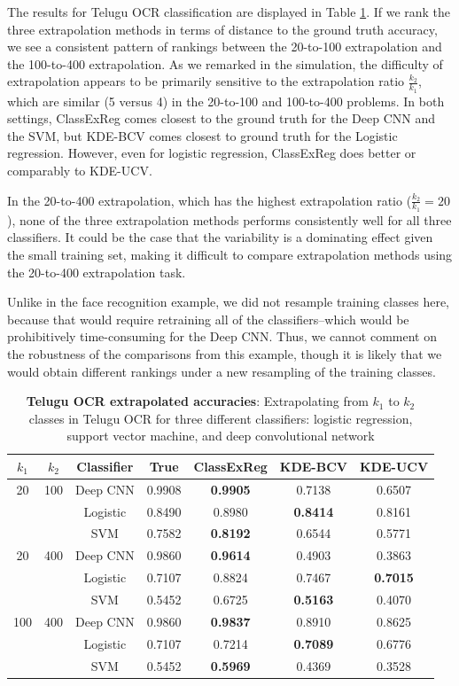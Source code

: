 \documentclass[twoside,11pt]{article}
\begin{document}
The results for Telugu OCR classification are displayed in Table \ref{tab:tel_accuracy}.  If we rank the three extrapolation methods in terms of distance to the ground truth accuracy, we see a consistent pattern of rankings between the 20-to-100 extrapolation and the 100-to-400 extrapolation.  As we remarked in the simulation, the difficulty of extrapolation appears to be primarily sensitive to the extrapolation ratio $\frac{k_2}{k_1}$, which are similar (5 versus 4) in the 20-to-100 and 100-to-400 problems.  In both settings, ClassExReg comes closest to the ground truth for the Deep CNN and the SVM, but KDE-BCV comes closest to ground truth for the Logistic regression.  However, even for logistic regression, ClassExReg does better or comparably to KDE-UCV.


In the 20-to-400 extrapolation, which has the highest extrapolation ratio ($\frac{k_2}{k_1} = 20$), none of the three extrapolation methods performs consistently well for all three classifiers.  It could be the case that the variability is a dominating effect given the small training set, making it difficult to compare extrapolation methods using the 20-to-400 extrapolation task.

Unlike in the face recognition example, we did not resample training classes here, because that would require retraining all of the classifiers--which would be prohibitively time-consuming for the Deep CNN.  Thus, we cannot comment on the robustness of the comparisons from this example, though it is likely that we would obtain different rankings under a new resampling of the training classes.

\begin{table}[t]
\centering
\begin{tabular}{c|c||c|c||c|c|c}
$k_1$ & $k_2$ & Classifier & True & ClassExReg & KDE-BCV & KDE-UCV \\ \hline
 20 & 100 & Deep CNN & 0.9908 & \textbf{0.9905} & 0.7138 & 0.6507 \\ 
    &     & Logistic & 0.8490 & 0.8980 & \textbf{0.8414} & 0.8161 \\
    &     & SVM      & 0.7582 & \textbf{0.8192} & 0.6544 & 0.5771 \\ \hline
 20 & 400 & Deep CNN & 0.9860 & \textbf{0.9614} & 0.4903 & 0.3863 \\
    &     & Logistic & 0.7107 & 0.8824 & 0.7467 & \textbf{0.7015} \\
    &     & SVM      & 0.5452 & 0.6725 & \textbf{0.5163} & 0.4070 \\ \hline
100 & 400 & Deep CNN & 0.9860 & \textbf{0.9837}& 0.8910 & 0.8625  \\ 
    &     & Logistic & 0.7107 & 0.7214& \textbf{0.7089} & 0.6776  \\
    &     & SVM      & 0.5452 & \textbf{0.5969}& 0.4369 & 0.3528  \\ 
\hline
\end{tabular}
\caption{\textbf{Telugu OCR extrapolated accuracies}: Extrapolating from $k_1$ to $k_2$ classes in Telugu OCR for three different classifiers: logistic regression, support vector machine, and deep convolutional network}\label{tab:tel_accuracy}
\end{table}
\end{document}
